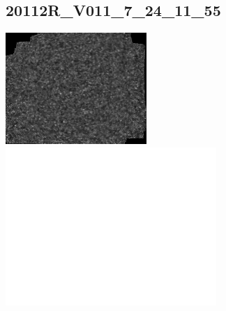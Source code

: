 \documentclass[11pt]{article}
\begin{document}
\subsection{20112R\_V011\_7\_24\_11\_55}
\includegraphics[width=0.40\textwidth, valign=m]{referenceframes/aoslo/20112R_V011_7_24_11_55_dwt_nostim_gamscaled_bandfilt_refframe.jpg}
\includegraphics[width=0.60\textwidth, valign=m]{eyepositiontraces/aoslo/20112R_V011_7_24_11_55.jpg}\\
\end{document}
